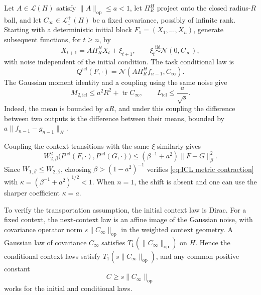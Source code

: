 \begin{example}
\label{ex:ICL infinite rank task}
Let \(A\in\mathcal L(H)\) satisfy \(\|A\|_{\mathrm{op}}\leqslant a<1\), let \(\Pi_R^H\) project onto the closed radius-\(R\) ball, and let \(C_\infty\in\mathcal L_1^+(H)\) be a fixed covariance, possibly of infinite rank. Starting with a deterministic initial block \(F_1=(X_1,\ldots,X_n)\), generate subsequent functions, for \(t\geqslant n\), by
\begin{equation}
\label{eq:ICL stochastic recursion}
X_{t+1}=A\Pi_R^HX_t+\xi_{t+1},
\qquad \xi_t\overset{\mathrm{iid}}\sim\mathcal N(0,C_\infty),
\end{equation}
with noise independent of the initial condition. The task conditional law is
\[
Q^{\mathrm{icl}}(F,\cdot)
=\mathcal N(A\Pi_R^Hf_{n-1},C_\infty).
\]
The Gaussian moment identity and a coupling using the same noise give
\begin{equation}
\label{eq:ICL infinite rank constants}
M_{2,\mathrm{icl}}\leqslant a^2R^2+\operatorname{tr}C_\infty,
\qquad
L_{\mathrm{icl}}\leqslant\frac{a}{\sqrt s}.
\end{equation}
Indeed, the mean is bounded by \(aR\), and under this coupling the difference between two outputs is the difference between their means, bounded by \(a\|f_{n-1}-g_{n-1}\|_H\).

Coupling the context transitions with the same \(\xi\) similarly gives
\[
W_{2,\beta}^2\bigl(P^{\mathrm{icl}}(F,\cdot),P^{\mathrm{icl}}(G,\cdot)\bigr)
\leqslant(\beta^{-1}+a^2)\|F-G\|_\beta^2.
\]
Since \(W_{1,\beta}\leqslant W_{2,\beta}\), choosing \(\beta>(1-a^2)^{-1}\) verifies \eqref{eq:ICL metric contraction} with \(\kappa=(\beta^{-1}+a^2)^{1/2}<1\). When \(n=1\), the shift is absent and one can use the sharper coefficient \(\kappa=a\).

To verify the transportation assumption, the initial context law is Dirac. For a fixed context, the next-context law is an affine image of the Gaussian noise, with covariance operator norm \(s\|C_\infty\|_{\mathrm{op}}\) in the weighted context geometry. A Gaussian law of covariance \(C_\infty\) satisfies \(T_1(\|C_\infty\|_{\mathrm{op}})\) on \(H\). Hence the conditional context laws satisfy \(T_1(s\|C_\infty\|_{\mathrm{op}})\), and any common positive constant
\[
C\geqslant s\|C_\infty\|_{\mathrm{op}}
\]
works for the initial and conditional laws.


\end{example}
